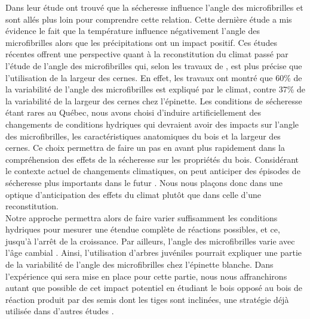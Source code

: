 \documentclass{report}
\begin{document}
\begin{itemize}
	Dans leur étude \cite{Wimmer2002} ont trouvé que la sécheresse influence l'angle des microfibrilles et \cite{Xu2012} sont allés plus loin pour comprendre cette relation. Cette dernière étude a mis évidence le fait que la température influence négativement l'angle des microfibrilles alors que les précipitations ont un impact positif. Ces études récentes offrent une perspective quant à la reconstitution du climat passé par l'étude de l'angle des microfibrilles qui, selon les travaux de \cite{Xu2012}, est plus précise que l'utilisation de la largeur des cernes. En effet, les travaux ont montré que 60\% de la variabilité de l'angle des microfibrilles est expliqué par le climat, contre 37\% de la variabilité de la largeur des cernes chez l'épinette. Les conditions de sécheresse étant rares au Québec, nous avons choisi d'induire artificiellement des changements de conditions hydriques qui devraient avoir des impacts sur l'angle des microfibrilles, les caractéristiques anatomiques du bois et la largeur des cernes. Ce choix permettra de faire un pas en avant plus rapidement dans la compréhension des effets de la sécheresse sur les propriétés du bois. Considérant le contexte actuel de changements climatiques, on peut anticiper des épisodes de sécheresse plus importants dans le futur \citep{IPCC_2015,Flato2001}. Nous nous plaçons donc dans une optique d'anticipation des effets du climat plutôt que dans celle d'une reconstitution. \\
	
	Notre approche permettra alors de faire varier suffisamment les conditions hydriques pour mesurer une étendue complète de réactions possibles, et ce, jusqu'à l'arrêt de la croissance. Par ailleurs, l'angle des microfibrilles varie avec l'âge cambial \citep{Lindstrom1998}. Ainsi, l'utilisation d'arbres juvéniles pourrait expliquer une partie de la variabilité de l'angle des microfibrilles chez l'épinette blanche. Dans l'expérience qui sera mise en place pour cette partie, nous nous affranchirons autant que possible de cet impact potentiel en étudiant le bois opposé au bois de réaction produit par des semis dont les tiges sont inclinées, une stratégie déjà utilisée dans d'autres études \citep{Apiolaza2011}.\\  
	

\end{itemize}
\end{document}
